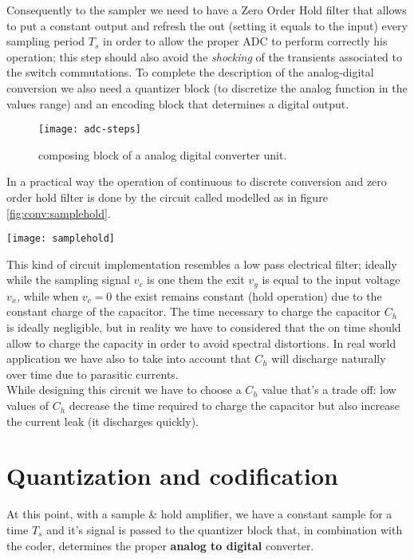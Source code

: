 		Consequently to the sampler we need to have a  Zero Order Hold filter that allows to put a constant output and refresh the out (setting it equals to the input) every sampling period $T_s$ in order to allow the proper ADC to perform correctly his operation; this step should also avoid the \textit{shocking} of the transients associated to the switch commutations. To complete the description of the analog-digital conversion we also need a quantizer block (to discretize the analog function in the values range) and an encoding block that determines a digital output. 
		
		\begin{figure}[bht]
			\centering
			\texttt{[image: adc-steps]}
			\caption{composing block of a analog digital converter unit.}
		\end{figure}
		
		In a practical way the operation of continuous to discrete conversion and zero order hold filter is done by the circuit called  modelled as in figure \ref{fig:conv:samplehold}.
		
		\begin{SCfigure}[2][bht]
			\centering
			\texttt{[image: samplehold]}
			\caption{possible implementation of an electrical sample\&hold amplifier. }
			\label{fig:conv:samplehold}
		\end{SCfigure}
	
		This kind of circuit implementation resembles a low pass electrical filter; ideally while the sampling signal $v_c$ is one them the exit $v_y$ is equal to the input voltage $v_x$, while when $v_c=0$ the exist remains constant (hold operation) due to the constant charge of the capacitor. The time necessary to charge the capacitor $C_h$ is ideally negligible, but in reality we have to considered that  the on time should allow to charge the capacity in order to avoid spectral distortions. In real world application we have also to take into account that $C_h$ will discharge naturally over time due to parasitic currents.\\
		While designing this circuit we have to choose a $C_h$ value that's a trade off: low values of $C_h$ decrease the time required to charge the capacitor but also increase the current leak (it discharges quickly).
		
\section{Quantization and codification}
	At this point, with a sample \& hold amplifier, we have a constant sample for a time $T_s$ and it's signal is passed to the quantizer block that, in combination with the coder, determines the proper \textbf{analog to digital} converter.
	
